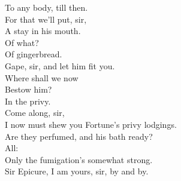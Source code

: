 \documentclass[a4paper,oneside,12pt]{memoir}
\begin{document}
\begin{drama*}
To any body, till then.\\
\facespeaks {} For that we'll put, sir,\\
A stay in his mouth.\\
\subtlespeaks {} Of what?\\
\facespeaks {} Of gingerbread.\\
Gape, sir, and let him fit you.\\
\subtlespeaks {} Where shall we now\\
Bestow him?\\
\dolspeaks {} In the privy.\\
\subtlespeaks {} Come along, sir,\\
I now must shew you Fortune's privy lodgings.\\
\facespeaks Are they perfumed, and his bath ready?\\
\subtlespeaks {} All:\\
Only the fumigation's somewhat strong.\\
\facespeaks {}
Sir Epicure, I am yours, sir, by and by.\\

\scene


\end{drama*}
\end{document}
